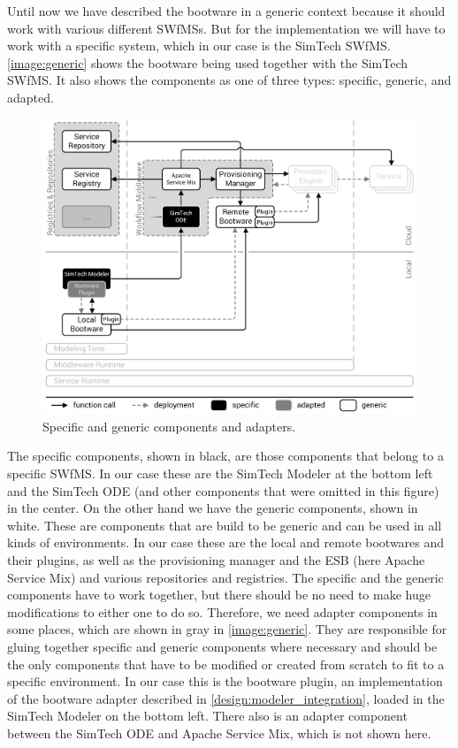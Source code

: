 Until now we have described the bootware in a generic context because it should work with various different SWfMSs.
But for the implementation we will have to work with a specific system, which in our case is the SimTech SWfMS.
\autoref{image:generic} shows the bootware being used together with the SimTech SWfMS.
It also shows the components as one of three types: specific, generic, and adapted.

\begin{figure}[!htbp]
	\centering
	\includegraphics[resolution=600]{implementation/assets/generic}
	\caption{Specific and generic components and adapters.}
	\label{image:generic}
\end{figure}

\pagebreak

The specific components, shown in black, are those components that belong to a specific SWfMS.
In our case these are the SimTech Modeler at the bottom left and the SimTech ODE (and other components that were omitted in this figure) in the center.
On the other hand we have the generic components, shown in white.
These are components that are build to be generic and can be used in all kinds of environments.
In our case these are the local and remote bootwares and their plugins, as well as the provisioning manager and the ESB (here Apache Service Mix) and various repositories and registries.
The specific and the generic components have to work together, but there should be no need to make huge modifications to either one to do so.
Therefore, we need adapter components in some places, which are shown in gray in \autoref{image:generic}.
They are responsible for gluing together specific and generic components where necessary and should be the only components that have to be modified or created from scratch to fit to a specific environment.
In our case this is the bootware plugin, an implementation of the bootware adapter described in \autoref{design:modeler_integration}, loaded in the SimTech Modeler on the bottom left.
There also is an adapter component between the SimTech ODE and Apache Service Mix, which is not shown here.

